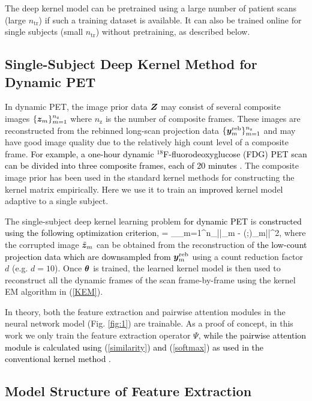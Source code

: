 \documentclass[]{IEEETran}
\newcommand{\Kc}{\mathcal{\K}}
\newcommand{\nz}{n_\mathrm{z}}
\newcommand{\reb}{\mathrm{reb}}
\newcommand{\nt}{n_\mathrm{tr}}
\newcommand{\txtb}[1]{\textcolor{black}{#1}}
\begin{document}
	The deep kernel model can be pretrained using a large number of patient scans (large $\nt$) if such a training dataset is available. It can also be trained online for single subjects (small $\nt$) without pretraining, as described below.
	
	
	\subsection{Single-Subject Deep Kernel Method for Dynamic PET}
	
	In dynamic PET, the image prior data $\bm{Z}$ may consist of several composite images $\{\z_m\}_{m=1}^{\nz}$ where $\nz$ is the number of composite frames. These images are reconstructed from the rebinned long-scan projection data $\{\y_m^{\reb}\}_{m=1}^{\nz}$ and may have good image quality due to the relatively high count level of a composite frame. \txtb{For example, a one-hour dynamic $^{18}$F-fluorodeoxyglucose (FDG) PET scan can be divided into three composite frames, each of 20 minutes \cite{Wang2015}.} The composite image prior has been used in the standard kernel methods for constructing the kernel matrix empirically. Here we use it to train an \txtb{improved} kernel model adaptive to a single subject.
	
	The single-subject deep kernel learning problem \txtb{for dynamic PET} is \txtb{constructed using the following optimization criterion},
	\beq
	\hat{\tht} = \arg\min\limits_{\tht}\sum_{m=1}^{\nz}||\z_m - \Kc(\tht;)\tilde{\z}_m||^2,
	\label{supervised}
	\eeq
	where the corrupted image $\tilde{\bm{z}}_m$ can be obtained from the reconstruction of \txtb{the low-count projection data which are downsampled from $\y_m^{\reb}$} using a count reduction factor $d$ (e.g. $d=10$). Once $\bm{\theta}$ is trained, the learned kernel model is then used to reconstruct all the dynamic frames of the scan frame-by-frame using the kernel EM algorithm in  (\ref{KEM}).
	
	In theory, both the feature extraction and pairwise attention modules in the neural network model (Fig. \ref{fig:1}) are trainable. As a proof of concept, in this work we only train the feature extraction operator $\Psi$, \txtb{while the pairwise attention module is calculated using (\ref{similarity}) and (\ref{softmax}) as used in the conventional kernel method \cite{Wang2015}.} 
	
	\subsection{Model Structure of Feature Extraction}
	
\end{document}
